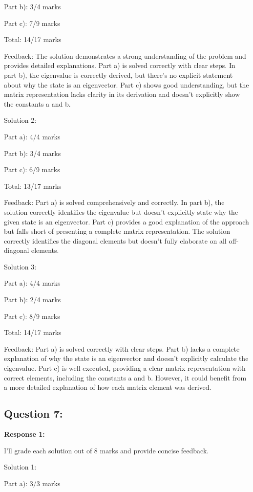 \documentclass[a4paper,11pt]{article}
\begin{document}
Part b): 3/4 marks

Part c): 7/9 marks

Total: 14/17 marks

Feedback: The solution demonstrates a strong understanding of the problem and provides detailed explanations. Part a) is solved correctly with clear steps. In part b), the eigenvalue is correctly derived, but there's no explicit statement about why the state is an eigenvector. Part c) shows good understanding, but the matrix representation lacks clarity in its derivation and doesn't explicitly show the constants a and b.

Solution 2:

Part a): 4/4 marks

Part b): 3/4 marks

Part c): 6/9 marks

Total: 13/17 marks

Feedback: Part a) is solved comprehensively and correctly. In part b), the solution correctly identifies the eigenvalue but doesn't explicitly state why the given state is an eigenvector. Part c) provides a good explanation of the approach but falls short of presenting a complete matrix representation. The solution correctly identifies the diagonal elements but doesn't fully elaborate on all off-diagonal elements.

Solution 3:

Part a): 4/4 marks

Part b): 2/4 marks

Part c): 8/9 marks

Total: 14/17 marks

Feedback: Part a) is solved correctly with clear steps. Part b) lacks a complete explanation of why the state is an eigenvector and doesn't explicitly calculate the eigenvalue. Part c) is well-executed, providing a clear matrix representation with correct elements, including the constants a and b. However, it could benefit from a more detailed explanation of how each matrix element was derived.

\subsection*{Question 7:}

\textbf{Response 1:}

I'll grade each solution out of 8 marks and provide concise feedback.

Solution 1:

Part a): 3/3 marks
\end{document}
